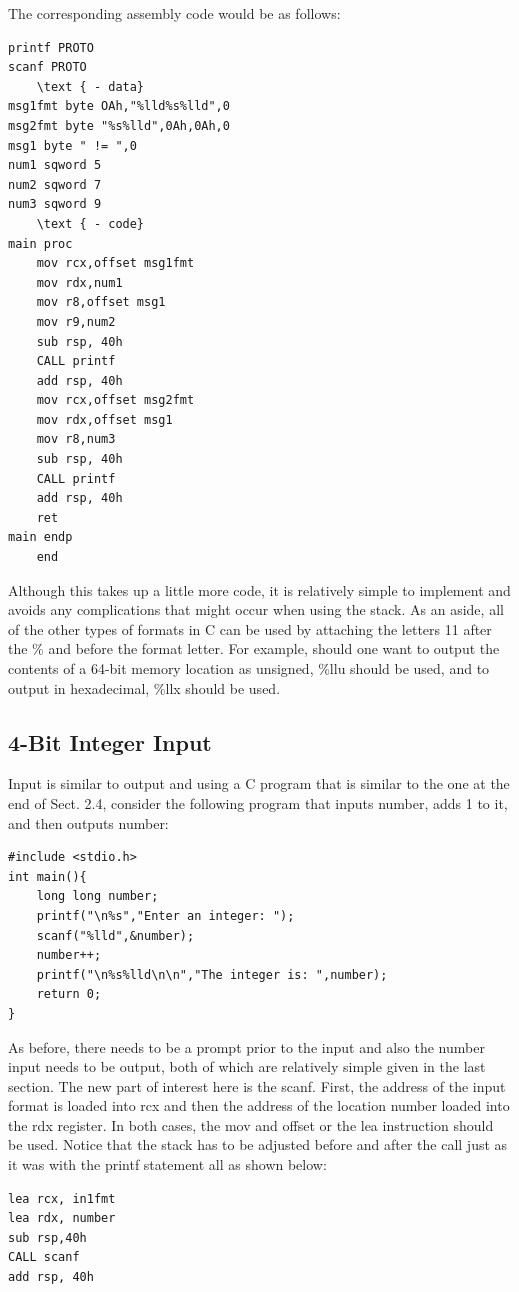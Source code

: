 \documentclass[10pt]{article}
\begin{document}
The corresponding assembly code would be as follows:

\begin{verbatim}
printf PROTO
scanf PROTO
    \text { - data}
msg1fmt byte OAh,"%lld%s%lld",0
msg2fmt byte "%s%lld",0Ah,0Ah,0
msg1 byte " != ",0
num1 sqword 5
num2 sqword 7
num3 sqword 9
    \text { - code}
main proc
    mov rcx,offset msg1fmt
    mov rdx,num1
    mov r8,offset msg1
    mov r9,num2
    sub rsp, 40h
    CALL printf
    add rsp, 40h
    mov rcx,offset msg2fmt
    mov rdx,offset msg1
    mov r8,num3
    sub rsp, 40h
    CALL printf
    add rsp, 40h
    ret
main endp
    end
\end{verbatim}

Although this takes up a little more code, it is relatively simple to implement and avoids any complications that might occur when using the stack. As an aside, all of the other types of formats in C can be used by attaching the letters 11 after the \% and before the format letter. For example, should one want to output the contents of a 64-bit memory location as unsigned, \%llu should be used, and to output in hexadecimal, \%llx should be used.

\subsection*{4-Bit Integer Input}
Input is similar to output and using a C program that is similar to the one at the end of Sect. 2.4, consider the following program that inputs number, adds 1 to it, and then outputs number:

\begin{verbatim}
#include <stdio.h>
int main(){
    long long number;
    printf("\n%s","Enter an integer: ");
    scanf("%lld",&number);
    number++;
    printf("\n%s%lld\n\n","The integer is: ",number);
    return 0;
}
\end{verbatim}

As before, there needs to be a prompt prior to the input and also the number input needs to be output, both of which are relatively simple given in the last section. The new part of interest here is the scanf. First, the address of the input format is loaded into rcx and then the address of the location number loaded into the rdx register. In both cases, the mov and offset or the lea instruction should be used. Notice that the stack has to be adjusted before and after the call just as it was with the printf statement all as shown below:

\begin{verbatim}
lea rcx, in1fmt
lea rdx, number
sub rsp,40h
CALL scanf
add rsp, 40h
\end{verbatim}
\end{document}
